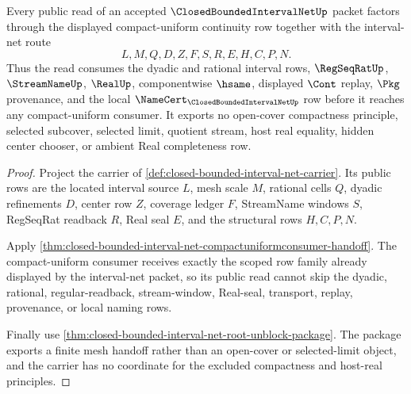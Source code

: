 \begin{theorem}
\label{thm:closed-bounded-interval-net-public-envelope}
Every public read of an accepted $\ClosedBoundedIntervalNetUp$ packet factors through the displayed compact-uniform continuity row together with the interval-net route
$$
L,M,Q,D,Z,F,S,R,E,H,C,P,N.
$$
Thus the read consumes the dyadic and rational interval rows, $\RegSeqRatUp$, $\StreamNameUp$, $\RealUp$, componentwise $\hsame$, displayed $\Cont$ replay, $\Pkg$ provenance, and the local $\NameCert_{\ClosedBoundedIntervalNetUp}$ row before it reaches any compact-uniform consumer. It exports no open-cover compactness principle, selected subcover, selected limit, quotient stream, host real equality, hidden center chooser, or ambient Real completeness row.
\end{theorem}
\begin{proof}
Project the carrier of \autoref{def:closed-bounded-interval-net-carrier}. Its public rows are the located interval source $L$, mesh scale $M$, rational cells $Q$, dyadic refinements $D$, center row $Z$, coverage ledger $F$, StreamName windows $S$, RegSeqRat readback $R$, Real seal $E$, and the structural rows $H,C,P,N$.

Apply \autoref{thm:closed-bounded-interval-net-compactuniformconsumer-handoff}. The compact-uniform consumer receives exactly the scoped row family already displayed by the interval-net packet, so its public read cannot skip the dyadic, rational, regular-readback, stream-window, Real-seal, transport, replay, provenance, or local naming rows.

Finally use \autoref{thm:closed-bounded-interval-net-root-unblock-package}. The package exports a finite mesh handoff rather than an open-cover or selected-limit object, and the carrier has no coordinate for the excluded compactness and host-real principles.
\end{proof}

